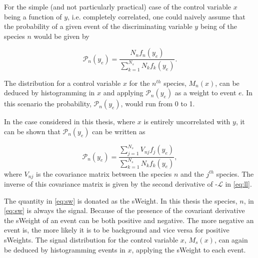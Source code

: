 For the simple (and not particularly practical) case of the control variable $x$ being a function of $y$, i.e. completely correlated, one could naively assume that the probability of a given event of the discriminating variable $y$ being of the species $n$ would be given by

\begin{equation}
  \mathcal{P}_{n} (y_{e}) = \frac{N_{n}f_{n}(y_{e})}{\sum^{N_{s}}_{k =1} N_{k}f_{k}(y_{e})}.
\end{equation}

The distribution for a control variable $x$ for the $n^{th}$ species, $M_{n}(x)$, can be deduced by histogramming in $x$ and applying $\mathcal{P}_{n} (y_{e})$ as a weight to event $e$. In this scenario the probability, $\mathcal{P}_{n} (y_{e})$, would run from 0 to 1.

In the case considered in this thesis, where $x$ is entirely uncorrelated with $y$, it can be shown that $\mathcal{P}_{n} (y_{e})$ can be written as

\begin{equation}
  \mathcal{P}_{n} (y_{e}) = \frac{\sum^{N_{s}}_{j = 1} V_{nj}f_{j}(y_{e})}{\sum^{N_{s}}_{k =1} N_{k}f_{k}(y_{e})},
  \label{eq:sw}
\end{equation}
where $V_{nj}$ is the covariance matrix between the species $n$ and the $j^{th}$ species. The inverse of this covariance matrix is given by the second derivative of -$\mathcal{L}$ in \autoref{eq:ll}.

The quantity in \autoref{eq:sw} is donated as the sWeight. In this thesis the species, $n$, in \autoref{eq:sw} is always the signal. Because of the presence of the covariant derivative the sWeight of an event can be both positive and negative. The more negative an event is, the more likely it is to be background and vice versa for positive sWeights. The signal distribution for the control variable $x$, $M_{s}(x)$, can again   be deduced by histogramming events in $x$, applying the sWeight to each event. %



